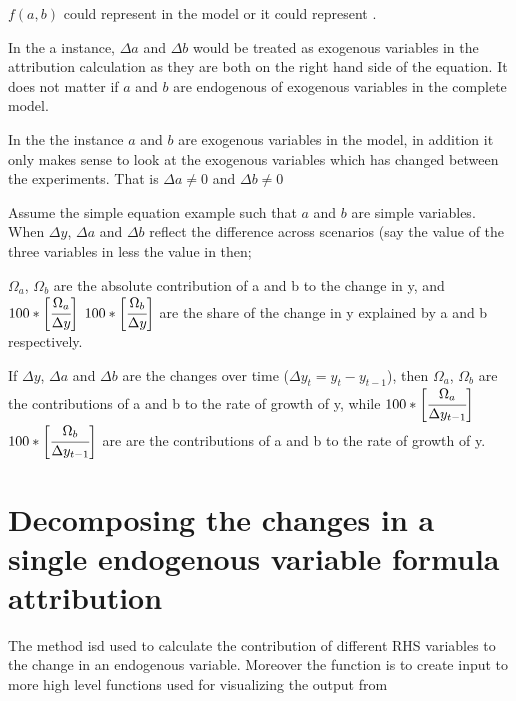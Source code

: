 \documentclass[letterpaper,10pt,english]{jupyterBook}
\begin{document}
\sphinxAtStartPar
\(f(a,b)\) could represent  in the model or it could represent .

\sphinxAtStartPar
In the a  instance, \(\Delta a\) and \(\Delta b\) would be treated as exogenous variables in the attribution calculation as they are both on the right hand side of the equation. It does not matter if \(a\) and \(b\) are endogenous of exogenous variables in the complete model.

\sphinxAtStartPar
In the the  instance \(a\) and \(b\) are exogenous variables in the model, in addition it only makes sense to look at the exogenous variables which has changed between the experiments. That is \(\Delta a \neq 0\) and \(\Delta b \neq 0\)

\sphinxAtStartPar
Assume the simple equation example such that  \(a\) and \(b\) are simple variables. When \(\Delta y\), \(\Delta a\) and \(\Delta b\) reflect the difference across scenarios (say the value of the three variables in  less the value in  then;

\sphinxAtStartPar
\(\Omega_a\), \(\Omega_b\) are the absolute contribution of a and b to the change in y, and
\(100*\bigg[\cfrac{\Omega_a}{\Delta y}\bigg]\)  \(100*\bigg[\cfrac{\Omega_b}{\Delta y}\bigg]\) are the share of the change in y explained by a and b respectively.

\sphinxAtStartPar
If \(\Delta y\), \(\Delta a\) and \(\Delta b\) are the changes over time (\(\Delta y_t=y_t-y_{t-1}\)), then \(\Omega_a\), \(\Omega_b\) are the contributions of a and b to the rate of growth of y, while \(100*\bigg[\cfrac{\Omega_a}{\Delta y_{t-1}}\bigg]\)  \(100*\bigg[\cfrac{\Omega_b}{\Delta y_{t-1}}\bigg]\) are are the contributions of a and b to the rate of growth of y.


\section{Decomposing the changes in a single endogenous variable \sphinxhyphen{} formula attribution}
\label{\detokenize{content/06_ModelAnalytics/Attribution:decomposing-the-changes-in-a-single-endogenous-variable-formula-attribution}}
\sphinxAtStartPar
The  method  isd used to calculate the contribution of different RHS variables to the change in an endogenous variable. Moreover the function is
to create input to more high level functions used for visualizing  the output from   
\end{document}
